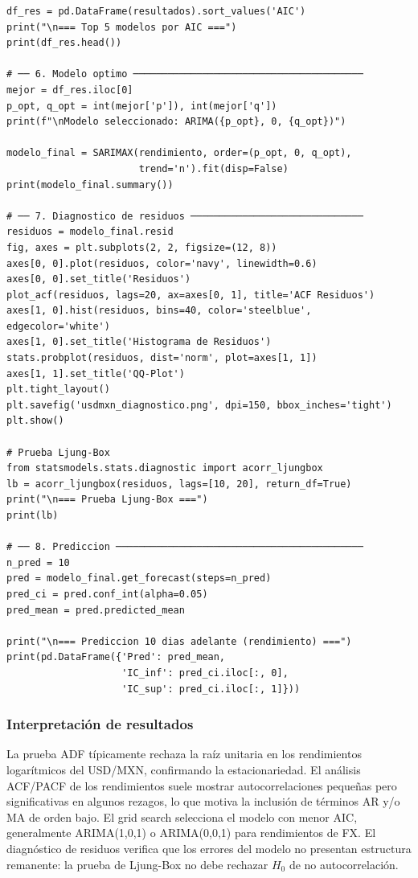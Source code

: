 \documentclass[12pt,a4paper]{article}
\begin{document}
\begin{lstlisting}[caption={Ejemplo 1: ARIMA para rendimientos USD/MXN},label=lst:usdmxn]
df_res = pd.DataFrame(resultados).sort_values('AIC')
print("\n=== Top 5 modelos por AIC ===")
print(df_res.head())

# ── 6. Modelo optimo ────────────────────────────────────────
mejor = df_res.iloc[0]
p_opt, q_opt = int(mejor['p']), int(mejor['q'])
print(f"\nModelo seleccionado: ARIMA({p_opt}, 0, {q_opt})")

modelo_final = SARIMAX(rendimiento, order=(p_opt, 0, q_opt),
                       trend='n').fit(disp=False)
print(modelo_final.summary())

# ── 7. Diagnostico de residuos ──────────────────────────────
residuos = modelo_final.resid
fig, axes = plt.subplots(2, 2, figsize=(12, 8))
axes[0, 0].plot(residuos, color='navy', linewidth=0.6)
axes[0, 0].set_title('Residuos')
plot_acf(residuos, lags=20, ax=axes[0, 1], title='ACF Residuos')
axes[1, 0].hist(residuos, bins=40, color='steelblue', edgecolor='white')
axes[1, 0].set_title('Histograma de Residuos')
stats.probplot(residuos, dist='norm', plot=axes[1, 1])
axes[1, 1].set_title('QQ-Plot')
plt.tight_layout()
plt.savefig('usdmxn_diagnostico.png', dpi=150, bbox_inches='tight')
plt.show()

# Prueba Ljung-Box
from statsmodels.stats.diagnostic import acorr_ljungbox
lb = acorr_ljungbox(residuos, lags=[10, 20], return_df=True)
print("\n=== Prueba Ljung-Box ===")
print(lb)

# ── 8. Prediccion ───────────────────────────────────────────
n_pred = 10
pred = modelo_final.get_forecast(steps=n_pred)
pred_ci = pred.conf_int(alpha=0.05)
pred_mean = pred.predicted_mean

print("\n=== Prediccion 10 dias adelante (rendimiento) ===")
print(pd.DataFrame({'Pred': pred_mean,
                    'IC_inf': pred_ci.iloc[:, 0],
                    'IC_sup': pred_ci.iloc[:, 1]}))
\end{lstlisting}

\subsubsection{Interpretación de resultados}

La prueba ADF típicamente rechaza la raíz unitaria en los rendimientos logarítmicos del
USD/MXN, confirmando la estacionariedad. El análisis ACF/PACF de los rendimientos suele
mostrar autocorrelaciones pequeñas pero significativas en algunos rezagos, lo que motiva
la inclusión de términos AR y/o MA de orden bajo. El grid search selecciona el modelo
con menor AIC, generalmente ARIMA(1,0,1) o ARIMA(0,0,1) para rendimientos de FX.
El diagnóstico de residuos verifica que los errores del modelo no presentan estructura
remanente: la prueba de Ljung-Box no debe rechazar $H_0$ de no autocorrelación.
\end{document}
